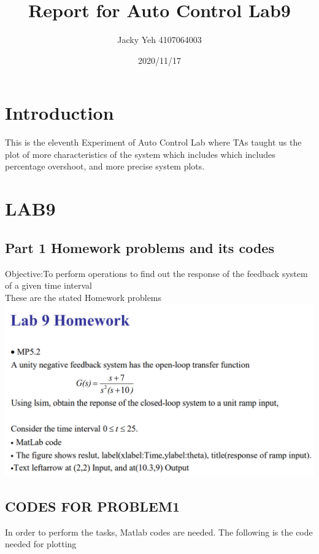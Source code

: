 \documentclass[12pt]{article}
\title{Report for Auto Control Lab9}
\date{2020/11/17}
\author{Jacky Yeh 4107064003}
\begin{document}
\begin{titlepage}

\maketitle
\end{titlepage}


\section{Introduction}
This is the eleventh Experiment of Auto Control Lab where TAs taught us the plot of more characteristics of the system which includes which includes percentage overshoot, and more precise system plots.


\section{LAB9}
\subsection{Part 1 Homework problems and its codes}
Objective:To perform operations to find out the response of the feedback system of a given time interval\\

These are the stated Homework problems\\

\includegraphics[scale=0.5]{../Lab9/Pictures/hw1.png} \\

\cleardoublepage

\subsection{CODES FOR PROBLEM1}
In order to perform the tasks, Matlab codes are needed. The following is the code needed for plotting\\
\end{document}

